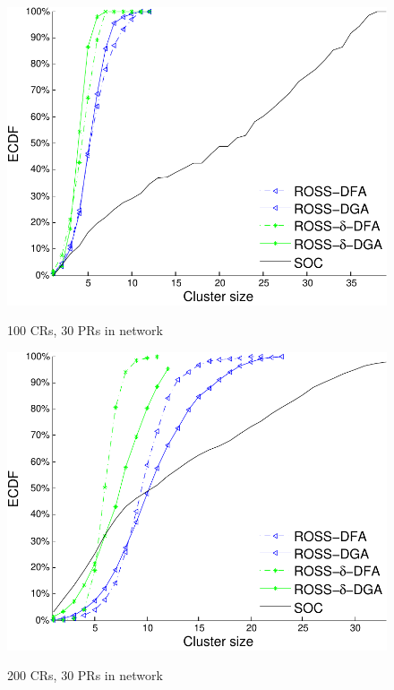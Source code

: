 \documentclass[10pt,journal,compsoc]{IEEEtran}
\theoremstyle{mytheoremstyle}
\theoremstyle{mytheoremstyle}
\theoremstyle{mytheoremstyle}
\begin{document}
\begin{figure}[t]
\begin{multicols}{3}
    \includegraphics[width=\linewidth]{cdf_clusterSize_100.pdf}\par\caption{100 CRs, 30 PRs in network}\label{cdf_clusterSize_100}
    \includegraphics[width=\linewidth]{cdf_clusterSize_200.pdf}\par\caption{200 CRs, 30 PRs in network}\label{cdf_clusterSize_200}

\end{multicols}
\end{figure}
\end{document}
